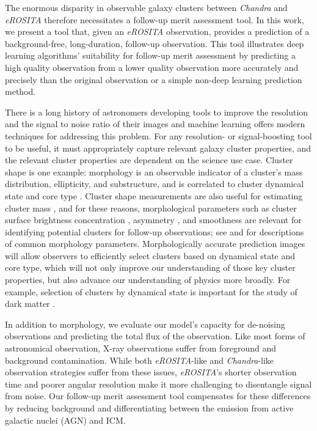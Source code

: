 The enormous disparity in observable galaxy clusters between \textit{Chandra} and \textit{eROSITA} therefore necessitates a follow-up merit assessment tool. In this work, we present a tool that, given an \textit{eROSITA} observation, provides a prediction of a background-free, long-duration, follow-up observation. This tool illustrates deep learning algorithms' suitability for follow-up merit assessment by predicting a high quality observation from a lower quality observation more accurately and precisely than the original observation or a simple non-deep learning prediction method. 

There is a long history of astronomers developing tools to improve the resolution and the signal to noise ratio of their images \cite[e.g.,][]{Richardson_1972,Lucy_1974,Cornwell_1985} and machine learning offers modern techniques for addressing this problem. For any resolution- or signal-boosting tool to be useful, it must appropriately capture relevant galaxy cluster properties, and the relevant cluster properties are dependent on the science use case.  Cluster shape is one example: morphology is an observable indicator of a cluster's mass distribution, ellipticity, and substructure, and is correlated to cluster dynamical state \cite{ Melott_2001, Rasia_2013, Parekh_2015, Lovisari_2017, Chen_2019, Lau_2021} and core type \cite{Santos_2008}.  Cluster shape measurements are also useful for estimating cluster mass \cite{Green_2019}, and for these reasons, morphological parameters such as cluster surface brightness concentration \cite{Santos_2008}, asymmetry \cite{Lotz_2004}, and smoothness \cite{Lotz_2004} are  relevant for identifying potential clusters for follow-up observations; see \cite{Rasia_2013} and \cite{Ghirardini_2022} for descriptions of common morphology parameters. Morphologically accurate prediction images will allow observers to efficiently select clusters based on dynamical state and core type, which will not only improve our understanding of those key cluster properties, but also advance our understanding of physics more broadly. For example, selection of clusters by dynamical state is important for the study of dark matter \cite[e.g.,][]{Eckert_2022}.

In addition to morphology, we evaluate our model's capacity for de-noising observations and predicting the total flux of the observation. Like most forms of astronomical observation, X-ray observations suffer from foreground and background contamination. While both \textit{eROSITA}-like and \textit{Chandra}-like observation strategies suffer from these issues, \textit{eROSITA}'s shorter observation time and poorer angular resolution make it more challenging to disentangle signal from noise. Our follow-up merit assessment tool compensates for these differences by reducing background and differentiating between the emission from active galactic nuclei (AGN) and ICM.

